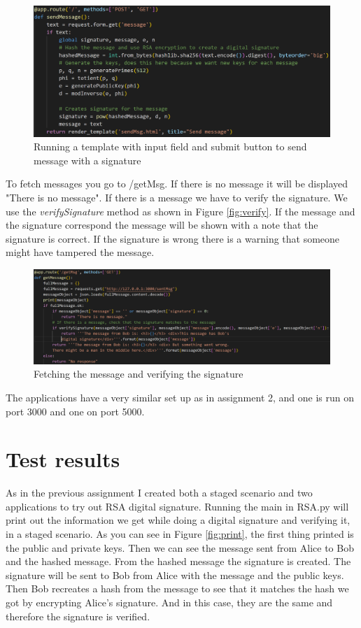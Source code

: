 \documentclass[12pt, letterpaper]{article}
\begin{document}
\begin{figure}[H]
  \includegraphics[width=\linewidth]{code_snippets/send.PNG}\centering
  \caption{Running a template with input field and submit button to send message with a signature}
  \label{fig:send}
\end{figure}

To fetch messages you go to /getMsg. If there is no message it will be displayed "There is no message". If there is a message we have to verify the signature. We use the \textit{verifySignature} method as shown in Figure \ref{fig:verify}. If the message and the signature correspond the message will be shown with a note that the signature is correct. If the signature is wrong there is a warning that someone might have tampered the message.
 
\begin{figure}[H]
  \hspace*{-50px}\includegraphics[width=500px]{code_snippets/get.PNG}\centering
  \caption{Fetching the message and verifying the signature}
  \label{fig:get}
\end{figure} 

The applications have a very similar set up as in assignment 2, and one is run on port 3000 and one on port 5000. 

\section*{Test results}

As in the previous assignment I created both a staged scenario and two applications to try out RSA digital signature. 
Running the main in RSA.py will print out the information we get while doing a digital signature and verifying it, in a staged scenario. As you can see in Figure \ref{fig:print}, the first thing printed is the public and private keys. Then we can see the message sent from Alice to Bob and the hashed message. From the hashed message the signature is created. The signature will be sent to Bob from Alice with the message and the public keys. Then Bob recreates a hash from the message to see that it matches the hash we got by encrypting Alice's signature. And in this case, they are the same and therefore the signature is verified.
\end{document}
